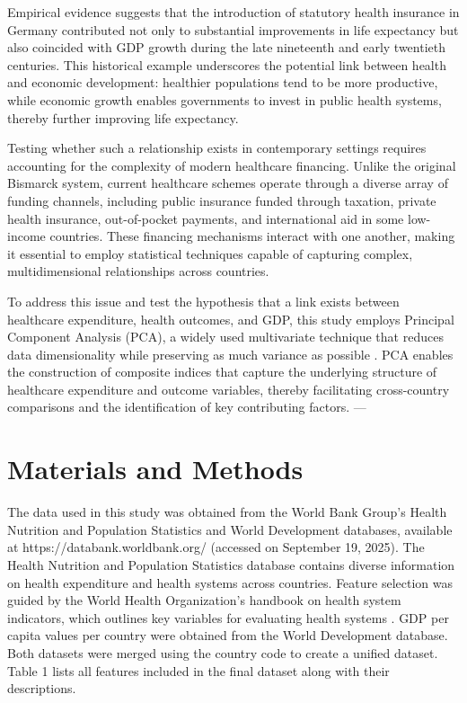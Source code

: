 \documentclass[11pt, a4paper]{article}
\begin{document}
Empirical evidence suggests that the introduction of statutory health insurance in Germany contributed not only to substantial improvements in life expectancy \parencite{bauernschuster2020} but also coincided with GDP growth \parencite{article} during the late nineteenth and early twentieth centuries. This historical example underscores the potential link between health and economic development: healthier populations tend to be more productive, while economic growth enables governments to invest in public health systems, thereby further improving life expectancy.  

Testing whether such a relationship exists in contemporary settings requires accounting for the complexity of modern healthcare financing. Unlike the original Bismarck system, current healthcare schemes operate through a diverse array of funding channels, including public insurance funded through taxation, private health insurance, out-of-pocket payments, and international aid in some low-income countries. These financing mechanisms interact with one another, making it essential to employ statistical techniques capable of capturing complex, multidimensional relationships across countries.  

To address this issue and test the hypothesis that a link exists between healthcare expenditure, health outcomes, and GDP, this study employs Principal Component Analysis (PCA), a widely used multivariate technique that reduces data dimensionality while preserving as much variance as possible \parencite{Jolliffe2002}. PCA enables the construction of composite indices that capture the underlying structure of healthcare expenditure and outcome variables, thereby facilitating cross-country comparisons and the identification of key contributing factors.   
---

\section{Materials and Methods}
\label{sec:materials_methods}

The data used in this study was obtained from the World Bank Group's Health Nutrition and Population Statistics and World Development databases, available at https://databank.worldbank.org/ (accessed on September 19, 2025). The Health Nutrition and Population Statistics database contains diverse information on health expenditure and health systems across countries. Feature selection was guided by the World Health Organization's handbook on health system indicators, which outlines key variables for evaluating health systems \parencite{WHO2010}. GDP per capita values per country were obtained from the World Development database. Both datasets were merged using the country code to create a unified dataset. Table 1 lists all features included in the final dataset along with their descriptions.
\end{document}
